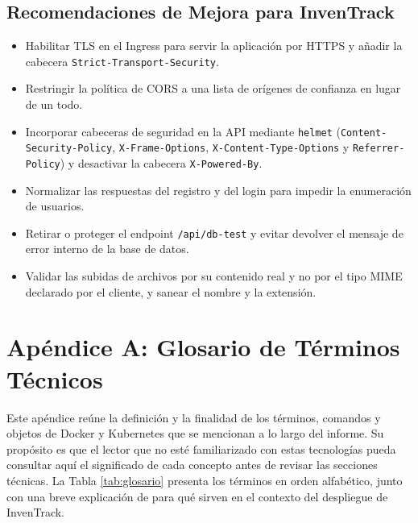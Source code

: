 \documentclass[stu,11pt,spanish,floatsintext]{apa7}
\begin{document}
\subsection{Recomendaciones de Mejora para InvenTrack}
\begin{itemize}
  \item Habilitar TLS en el Ingress para servir la aplicación por HTTPS y añadir la cabecera \texttt{Strict-Transport-Security}.
  \item Restringir la política de CORS a una lista de orígenes de confianza en lugar de un todo.
  \item Incorporar cabeceras de seguridad en la API mediante \texttt{helmet} (\texttt{Content-Security-Policy}, \texttt{X-Frame-Options}, \texttt{X-Content-Type-Options} y \texttt{Referrer-Policy}) y desactivar la cabecera \texttt{X-Powered-By}.
  \item Normalizar las respuestas del registro y del login para impedir la enumeración de usuarios.
  \item Retirar o proteger el endpoint \texttt{/api/db-test} y evitar devolver el mensaje de error interno de la base de datos.
  \item Validar las subidas de archivos por su contenido real y no por el tipo MIME declarado por el cliente, y sanear el nombre y la extensión.
\end{itemize}

\printbibliography[title={Referencias}]

\appendix
\section{Apéndice A: Glosario de Términos Técnicos}

Este apéndice reúne la definición y la finalidad de los términos, comandos y objetos de Docker y Kubernetes que se mencionan a lo largo del informe. Su propósito es que el lector que no esté familiarizado con estas tecnologías pueda consultar aquí el significado de cada concepto antes de revisar las secciones técnicas. La Tabla \ref{tab:glosario} presenta los términos en orden alfabético, junto con una breve explicación de para qué sirven en el contexto del despliegue de InvenTrack.
\end{document}
